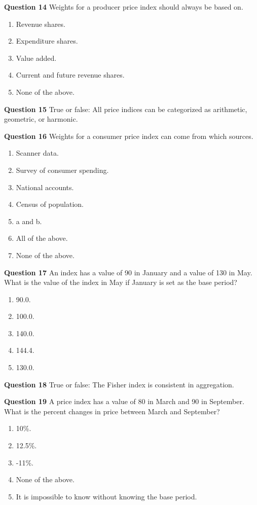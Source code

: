 \documentclass[
]{article}
\begin{document}
\textbf{Question 14} Weights for a producer price index should always be based on.

\begin{enumerate}
\def\labelenumi{\alph{enumi})}
\item
  Revenue shares.
\item
  Expenditure shares.
\item
  Value added.
\item
  Current and future revenue shares.
\item
  None of the above.
\end{enumerate}

\textbf{Question 15} True or false: All price indices can be categorized as arithmetic, geometric, or harmonic.

\textbf{Question 16} Weights for a consumer price index can come from which sources.

\begin{enumerate}
\def\labelenumi{\alph{enumi})}
\item
  Scanner data.
\item
  Survey of consumer spending.
\item
  National accounts.
\item
  Census of population.
\item
  a and b.
\item
  All of the above.
\item
  None of the above.
\end{enumerate}

\textbf{Question 17} An index has a value of 90 in January and a value of 130 in May. What is the value of the index in May if January is set as the base period?

\begin{enumerate}
\def\labelenumi{\alph{enumi})}
\item
  90.0.
\item
  100.0.
\item
  140.0.
\item
  144.4.
\item
  130.0.
\end{enumerate}

\textbf{Question 18} True or false: The Fisher index is consistent in aggregation.

\textbf{Question 19} A price index has a value of 80 in March and 90 in September. What is the percent changes in price between March and September?

\begin{enumerate}
\def\labelenumi{\alph{enumi})}
\item
  10\%.
\item
  12.5\%.
\item
  -11\%.
\item
  None of the above.
\item
  It is impossible to know without knowing the base period.
\end{enumerate}
\end{document}
